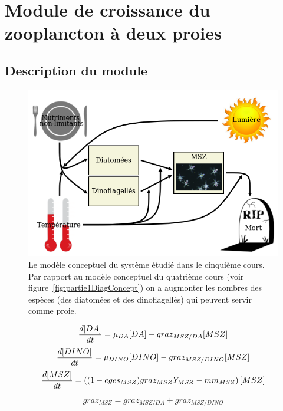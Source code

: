 \section{Module de croissance du zooplancton à deux proies}

\subsection{Description du module}

\begin{figure}
  \includegraphics[width=\textwidth]{partie2/diagConc.png}
  \caption{Le modèle conceptuel du système étudié dans le cinquième cours. Par rapport
au modèle conceptuel du quatrième cours (voir figure~\ref{fig:partie1DiagConcept}) on
a augmonter les nombres des espèces (des diatomées et des dinoflagellés) qui peuvent
servir comme proie.
}
  \label{fig:partie2DiagConc}
\end{figure}

\begin{equation}
  {{d[DA]}\over{dt}} =
  \mu_{DA} [DA] - graz_{MSZ/DA} [MSZ]
  \label{eq:partie2DiffEq1}
\end{equation}
\begin{equation}
  {{d[DINO]}\over{dt}} =
  \mu_{DINO} [DINO] - graz_{MSZ/DINO} [MSZ]
  \label{eq:partie2DiffEq2}
\end{equation}
\begin{equation}
  {{d[MSZ]}\over{dt}} =
  \left (
    (1- eges_{MSZ}) graz_{MSZ} Y_{MSZ} - mm_{MSZ}
  \right ) [MSZ]
  \label{eq:partie2DiffEq3}
\end{equation}


\begin{equation}
  graz_{MSZ} = graz_{MSZ/DA} + graz_{MSZ/DINO}
  \label{eq:partie2grazMsz}
\end{equation}

